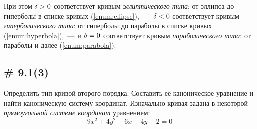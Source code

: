 \documentclass[a4paper,12pt]{article}
\begin{document}
  При этом $\delta \hm> 0$ соответствует кривым \emph{эллиптического типа}: от эллипса до гиперболы в списке кривых (\ref{enum:ellipse}),~---~$\delta \hm< 0$ соответствует кривым \emph{гиперболического типа}: от гиперболы до параболы в списке кривых (\ref{enum:hyperbola}),~---~и $\delta \hm= 0$ соответствует кривым \emph{параболического типа}: от параболы и далее (\ref{enum:parabola}).
  
  
  \subsection{\# 9.1(3)}
  
  Определить тип кривой второго порядка.
  Составить её каноническое уравнение и найти каноническую систему координат.
  Изначально кривая задана в некоторой \emph{прямоугольной системе координат} уравнением:
  \begin{equation}\label{eq:problem-9-1}
    9x^2 + 4y^2 + 6x - 4y - 2 = 0
  \end{equation}
  
\end{document}
